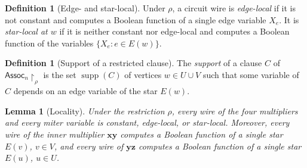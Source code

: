\documentclass[11pt]{article}
\newtheorem{lemma}[theorem]{Lemma}
\theoremstyle{definition}
\newtheorem{definition}[theorem]{Definition}
\theoremstyle{remark}
\newcommand{\Assoc}{\mathsf{Assoc}}
\newcommand{\supp}{\operatorname{supp}}
\newcommand{\vv}[1]{\mathbf{#1}}
\begin{document}
\begin{definition}[Edge- and star-local]
\label{def:edge-star-local}
Under $\rho$, a circuit wire is \emph{edge-local} if it is not constant and computes a Boolean function of a single edge variable
$X_e$. It is \emph{star-local at $w$} if it is neither constant nor edge-local and computes a Boolean function of the variables
$\{X_e:e\in E(w)\}$.
\end{definition}

\begin{definition}[Support of a restricted clause]
\label{def:support}
The \emph{support} of a clause $C$ of $\Assoc_n\!\upharpoonright_\rho$ is the set $\supp(C)$ of vertices $w\in U\cup V$ such that some variable of $C$ depends on an edge variable of the star $E(w)$.
\end{definition}

\begin{lemma}[Locality]
\label{lem:locality}
Under the restriction $\rho$, every wire of the four multipliers and every miter variable is constant, edge-local, or star-local. Moreover, every wire of the inner multiplier $\vv{x}\vv{y}$ computes a Boolean function of a single star $E(v)$, $v\in V$, and every wire of $\vv{y}\vv{z}$ computes a Boolean function of a single star $E(u)$, $u\in U$.
\end{lemma}
\end{document}
